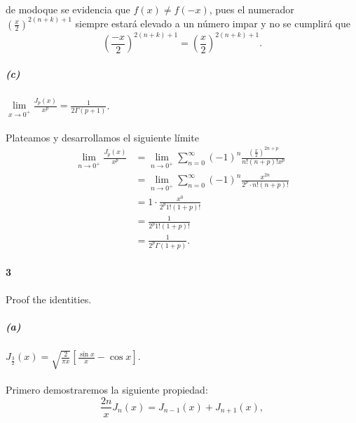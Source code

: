 \documentclass{article}
\begin{document}
\paragraph{} de modoque se evidencia que $f(x) \neq f(-x)$, pues el numerador $(\frac{x}{2})^{2(n+k) + 1}$ siempre estará elevado a un número impar y no se cumplirá que
$$\left(\frac{-x}{2}\right)^{2(n+k) + 1} = \left(\frac{x}{2}\right)^{2(n+k) + 1}.$$
\subparagraph{(c)} $\lim\limits_{x \rightarrow 0^+} \frac{J_p(x)}{x^p} = \frac{1}{2 \Gamma(p+1)}$.
\paragraph{} Plateamos y desarrollamos el siguiente límite
\begin{align*}
\lim\limits_{n \rightarrow 0^+} \frac{J_p(x)}{x^p} &= \lim\limits_{n \rightarrow 0^+} \sum_{n=0}^{\infty} (-1)^n \frac{(\frac{x}{2})^{2n + p}}{n!(n+p)! x^p}\\
&= \lim\limits_{n \rightarrow 0^+} \sum_{n=0}^{\infty} (-1)^n \frac{x^{2n}}{2^p \cdot n!(n+p)!}\\
&= 1 \cdot \frac{x^0}{2^p 1! (1 + p)!}\\
&= \frac{1}{2^p 1! (1 + p)!}\\
&= \frac{1}{2^p \Gamma(1+p)}.
\end{align*}
\paragraph{3} Proof the identities.
\subparagraph{(a)} $J_{\frac{3}{2}}(x) = \sqrt{\frac{2}{\pi x}} \left[\frac{\sin{x}}{x} - \cos {x}\right].$
\paragraph{} Primero demostraremos la siguiente propiedad:
\begin{equation}
\frac{2n}{x} J_n(x) = J_{n-1}(x) + J_{n+1}(x)\label{eq:prop_a},
\end{equation}
\end{document}
